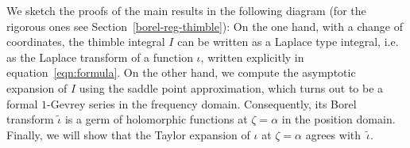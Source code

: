 \documentclass{article}
\let\Re\relax
\DeclareMathOperator{\Re}{Re}
\newcommand{\C}{\mathbb{C}}
\newcommand{\series}[1]{\tilde{#1}}
\newcommand{\fracderiv}[3]{\partial^{#1}_{#2, #3}}
\newcommand*{\defeq}{\mathrel{\vcenter{\baselineskip0.5ex \lineskiplimit0pt
                     \hbox{\scriptsize.}\hbox{\scriptsize.}}}%
                     =}
\newcommand{\laplace}{\mathcal{L}}
\newcommand{\borel}{\mathcal{B}}
\newcommand{\aexp}{\text{\ae}}
\theoremstyle{definition}
\theoremstyle{plain}
\newtheorem{theorem}{Theorem}[section]
\begin{document}
\color{RoyalBlue}
We sketch the proofs of the main results in the following diagram (for the rigorous ones see Section~\ref{borel-reg-thimble}):
On the one hand, with a change of coordinates, the thimble integral $I$ can be written as a Laplace type integral, i.e. as the Laplace transform of a function $\iota$, written explicitly in equation~\eqref{eqn:formula}. 
On the other hand, we compute the asymptotic expansion of $I$ using the saddle point approximation, which turns out to be a formal $1$-Gevrey series in the frequency domain. Consequently, its Borel transform $\series{\iota}$ is a germ of holomorphic functions at $\zeta=\alpha$ in the position domain. Finally, we will show that the Taylor expansion of $\iota$ at $\zeta=\alpha$ agrees with~$\tilde{\iota}$. 
\end{document}
